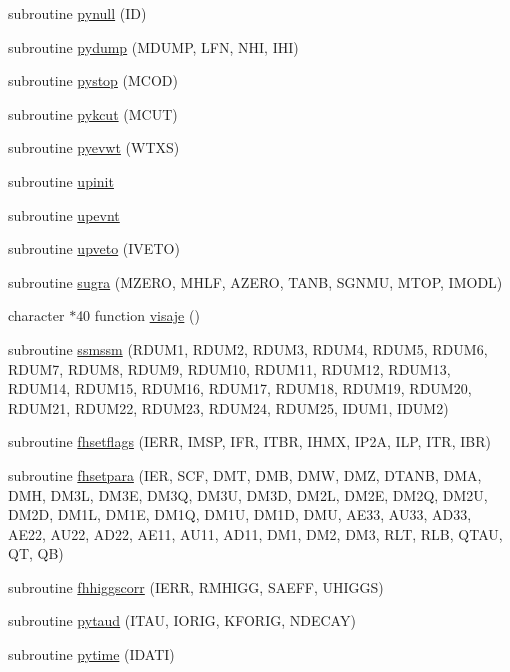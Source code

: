 \begin{DoxyCompactItemize}
\item 
subroutine \hyperlink{pythia-6_84_824_8f_a49f22066d04601429fc3a754c7496366}{pynull} (ID)
\item 
subroutine \hyperlink{pythia-6_84_824_8f_a20a3192b9213b8f1ecea4b1519dcffc1}{pydump} (M\+D\+U\+MP, L\+FN, N\+HI, I\+HI)
\item 
subroutine \hyperlink{pythia-6_84_824_8f_a4140396b9ec9bafcebf4c7ebecb462e7}{pystop} (M\+C\+OD)
\item 
subroutine \hyperlink{pythia-6_84_824_8f_aa0d00f200e99efa1612d9551bd6fa140}{pykcut} (M\+C\+UT)
\item 
subroutine \hyperlink{pythia-6_84_824_8f_a5799e48fb2bcb7e50b682d42162bb5c4}{pyevwt} (W\+T\+XS)
\item 
subroutine \hyperlink{pythia-6_84_824_8f_aec7740054c676cf077fa61911c75a152}{upinit}
\item 
subroutine \hyperlink{pythia-6_84_824_8f_a3e6163857666f9911e3a4a6af4ff5fa0}{upevnt}
\item 
subroutine \hyperlink{pythia-6_84_824_8f_a43c4225aee761c5da2aa460915d635e1}{upveto} (I\+V\+E\+TO)
\item 
subroutine \hyperlink{pythia-6_84_824_8f_a0a9ab2acbdfa0c53863d0570d5c8195e}{sugra} (M\+Z\+E\+RO, M\+H\+LF, A\+Z\+E\+RO, T\+A\+NB, S\+G\+N\+MU, M\+T\+OP, I\+M\+O\+DL)
\item 
character $\ast$40 function \hyperlink{pythia-6_84_824_8f_a86533917dbffaccdf34edd0843bb7dcb}{visaje} ()
\item 
subroutine \hyperlink{pythia-6_84_824_8f_a36c355d934e1add83191d4771bdc42b6}{ssmssm} (R\+D\+U\+M1, R\+D\+U\+M2, R\+D\+U\+M3, R\+D\+U\+M4, R\+D\+U\+M5, R\+D\+U\+M6, R\+D\+U\+M7, R\+D\+U\+M8, R\+D\+U\+M9, R\+D\+U\+M10, R\+D\+U\+M11, R\+D\+U\+M12, R\+D\+U\+M13, R\+D\+U\+M14, R\+D\+U\+M15, R\+D\+U\+M16, R\+D\+U\+M17, R\+D\+U\+M18, R\+D\+U\+M19, R\+D\+U\+M20, R\+D\+U\+M21, R\+D\+U\+M22, R\+D\+U\+M23, R\+D\+U\+M24, R\+D\+U\+M25, I\+D\+U\+M1, I\+D\+U\+M2)
\item 
subroutine \hyperlink{pythia-6_84_824_8f_ace9d6bb1ab3a0a99d03c5349150b6df6}{fhsetflags} (I\+E\+RR, I\+M\+SP, I\+FR, I\+T\+BR, I\+H\+MX, I\+P2A, I\+LP, I\+TR, I\+BR)
\item 
subroutine \hyperlink{pythia-6_84_824_8f_af13999968d4310ceacf1f109a96c18fe}{fhsetpara} (I\+ER, S\+CF, D\+MT, D\+MB, D\+MW, D\+MZ, D\+T\+A\+NB, D\+MA, D\+MH, D\+M3L, D\+M3E, D\+M3Q, D\+M3U, D\+M3D, D\+M2L, D\+M2E, D\+M2Q, D\+M2U, D\+M2D, D\+M1L, D\+M1E, D\+M1Q, D\+M1U, D\+M1D, D\+MU, A\+E33, A\+U33, A\+D33, A\+E22, A\+U22, A\+D22, A\+E11, A\+U11, A\+D11, D\+M1, D\+M2, D\+M3, R\+LT, R\+LB, Q\+T\+AU, QT, QB)
\item 
subroutine \hyperlink{pythia-6_84_824_8f_aaab7f08e5ab3ff24e4972c6341e3800f}{fhhiggscorr} (I\+E\+RR, R\+M\+H\+I\+GG, S\+A\+E\+FF, U\+H\+I\+G\+GS)
\item 
subroutine \hyperlink{pythia-6_84_824_8f_ac915defed887990f1ac86812b9c11c49}{pytaud} (I\+T\+AU, I\+O\+R\+IG, K\+F\+O\+R\+IG, N\+D\+E\+C\+AY)
\item 
subroutine \hyperlink{pythia-6_84_824_8f_a523e4acf745637220400daf831c34a23}{pytime} (I\+D\+A\+TI)
\end{DoxyCompactItemize}


